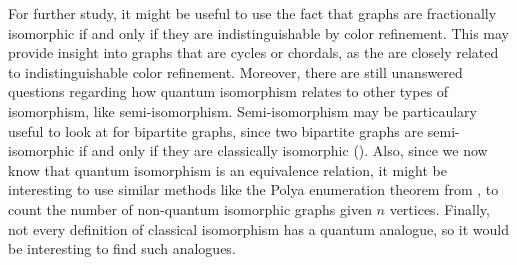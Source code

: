 \documentclass[12pt]{article}
\begin{document}
For further study, it might be useful to use the fact that graphs are fractionally isomorphic if and only if they are indistinguishable by color refinement. This may provide insight into graphs that are cycles or chordals, as the are closely related to indistinguishable color refinement. Moreover, there are still unanswered questions regarding how quantum isomorphism relates to other types of isomorphism, like semi-isomorphism. Semi-isomorphism may be particaulary useful to look at for bipartite graphs, since two bipartite graphs are semi-isomorphic if and only if they are classically isomorphic (\cite{fractional}).  Also, since we now know that quantum isomorphism is an equivalence relation, it might be interesting to use similar methods like the Polya enumeration theorem from \cite{comb}, to count the number of non-quantum isomorphic graphs given $n$ vertices. Finally, not every definition of classical isomorphism has a quantum analogue, so it would be interesting to find such analogues.

\newpage



\end{document}
